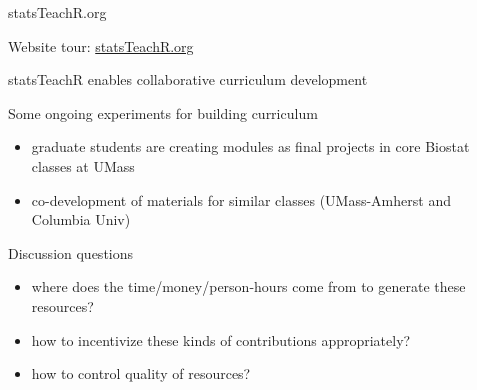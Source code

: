 
\begin{frame}{statsTeachR.org}

Website tour: \href{http://statsTeachR.org}{statsTeachR.org}

\end{frame}


\begin{frame}{statsTeachR enables collaborative curriculum development}

\begin{block}{Some ongoing experiments for building curriculum}
\begin{itemize}
        \item graduate students are creating modules as final projects in core Biostat classes at UMass
        \item co-development of materials for similar classes (UMass-Amherst and Columbia Univ) 
\end{itemize}
\end{block}


\end{frame}


\begin{frame}{Discussion questions}

\begin{itemize}
        \item where does the time/money/person-hours come from to generate these resources?
        \item how to incentivize these kinds of contributions appropriately?
        \item how to control quality of resources?
\end{itemize}
\end{frame}



